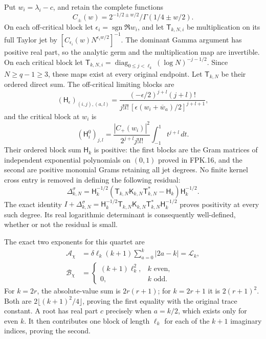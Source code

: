 \documentclass[11pt,a4paper]{article}
\begin{document}
Put $w_i=\lambda_i-c$, and retain the complete functions
\[
C_\pm(w)=2^{-1/2\pm w/2}/\Gamma(1/4\pm w/2).
\]
On each off-critical block let $\epsilon_i=\operatorname{sgn}\Re w_i$,
and let $\mathsf T_{k,N,i}$ be multiplication on its full Taylor
jet by $[C_{\epsilon_i}(w)N^{\epsilon_iw/2}]^{-1}$.
The dominant Gamma argument has positive real part, so the
analytic germ and the multiplication map are invertible. On
each critical block let
$\mathsf T_{k,N,i}=\operatorname{diag}_{0\le j<\ell_k}
(\log N)^{-j-1/2}$. Since $N\ge q-1\ge3$, these maps exist at
every original endpoint. Let $\mathsf T_{k,N}$ be their ordered
direct sum. The off-critical limiting blocks are
\[
(\mathsf H_\epsilon)_{(i,j),(a,l)}
=\frac{(-\epsilon/2)^{j+l}(j+l)!}
{j!l!\,[\epsilon(w_i+\overline w_a)/2]^{j+l+1}},
\]
and the critical block at $w_i$ is
\[
(\mathsf H_i^0)_{j,l}
=\frac{|C_+(w_i)|^2}{2^{j+l}j!l!}\int_{-1}^1t^{j+l}\,dt.
\]
Their ordered block sum $\mathsf H_k$ is positive: the first
blocks are the Gram matrices of independent exponential
polynomials on $(0,1)$ proved in FPK.16, and the second are
positive monomial Grams retaining all jet degrees. No finite
kernel cross entry is removed in defining the following residual:
\[
\Delta_{k,N}^\sigma
=\mathsf H_k^{-1/2}
 (\mathsf T_{k,N}\mathsf K_{k,N}\mathsf T_{k,N}^*
                                      -\mathsf H_k)
 \mathsf H_k^{-1/2}.
\tag{TWA20}
\]
The exact identity $I+\Delta_{k,N}^\sigma
=\mathsf H_k^{-1/2}\mathsf T_{k,N}\mathsf K_{k,N}
\mathsf T_{k,N}^*\mathsf H_k^{-1/2}$ proves positivity at every
such degree. Its real logarithmic determinant is consequently
well-defined, whether or not the residual is small.

The exact two exponents for this quartet are
\[
\begin{aligned}
\mathcal A_\chi
 &=\delta\ell_k(k+1)\sum_{a=0}^k|2a-k|
 =\mathcal L_k,\\
\mathcal B_\chi
 &=\begin{cases}(k+1)\ell_k^2,&k\text{ even},\\0,&k\text{ odd}.
\end{cases}
\end{aligned}\tag{TWA21}
\]
For $k=2r$, the absolute-value sum is $2r(r+1)$; for $k=2r+1$
it is $2(r+1)^2$. Both are $2\lfloor(k+1)^2/4\rfloor$,
proving the first equality with the original trace constant.
A root has real part $c$ precisely when $a=k/2$, which exists
only for even $k$. It then contributes one block of length
$\ell_k$ for each of the $k+1$ imaginary indices, proving the second.
\end{document}
